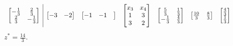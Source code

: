 \begin{equation*}
{\begin{array}{ c|c c c c c c c c c c c c c }
\begin{bmatrix}
-\frac{1}{3} & \frac{2}{3}\\
\frac{2}{3} & -\frac{1}{3}
\end{bmatrix} & \begin{bmatrix}
-3 & -2
\end{bmatrix} & \begin{bmatrix}
-1 & -1 & 
\end{bmatrix} & \begin{bmatrix}
x_{3} & x_{4}\\
1 & 3\\
3 & 2
\end{bmatrix} & \begin{bmatrix}
\frac{5}{3} & \frac{1}{3}\\
-\frac{1}{3} & \frac{4}{3}
\end{bmatrix} & \begin{bmatrix}
\frac{10}{3} & \frac{8}{3}
\end{bmatrix} & \begin{bmatrix}
\frac{4}{3}\\
\frac{1}{3}
\end{bmatrix} &  &  &  & 
\end{array}
}
\end{equation*}
$z^{*} =\frac{14}{3}$.

